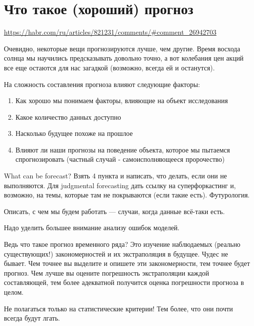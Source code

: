 \section{Что такое (хороший) прогноз}
\label{sec:forecast_quality}

\url{https://habr.com/ru/articles/821231/comments/#comment_26942703}


Очевидно, некоторые вещи прогнозируются лучше, чем другие. Время восхода солнца
мы научились предсказывать довольно точно, а вот колебания цен акций
все еще остаются для нас загадкой (возможно, всегда ей и останутся).

На сложность составления прогноза влияют следующие факторы:

\begin{enumerate}
  \item Как хорошо мы понимаем факторы, влияющие на объект исследования
  \item Какое количество данных доступно
  \item Насколько будущее похоже на прошлое
  \item Влияют ли наши прогнозы на поведение объекта, которое мы
    пытаемся спрогнозировать (частный случай - самоисполняющееся пророчество)
\end{enumerate}

What can be forecast? Взять 4 пункта и написать, что делать, если они
не выполняются. Для judgmental forecasting дать ссылку на
суперфоркастинг и, возможно, на темы, которые там не покрываются
(если такие есть). Футурология.

Описать, с чем мы будем работать — случаи, когда данные всё-таки есть.

Надо уделить большее внимание анализу ошибок моделей.

Ведь что такое прогноз временного ряда? Это изучение наблюдаемых
(реально существующих!) закономерностей и их экстраполяция в будущее.
Чудес не бывает. Чем точнее вы выделите и опишете эти закономерности,
тем точнее будет прогноз. Чем лучше вы оцените погрешность
экстраполяции каждой составляющей, тем более адекватной получится
оценка погрешности прогноза в целом.

Не полагаться только на статистические критерии! Тем более, что они
почти всегда будут лгать.


